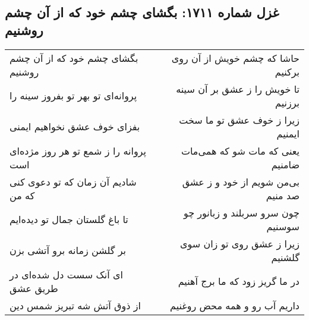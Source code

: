 \begin{center}
\section*{غزل شماره ۱۷۱۱: بگشای چشم خود که از آن چشم روشنیم}
\label{sec:1711}
\begin{longtable}{l p{0.5cm} r}
بگشای چشم خود که از آن چشم روشنیم
&&
حاشا که چشم خویش از آن روی برکنیم
\\
پروانه‌ای تو بهر تو بفروز سینه را
&&
تا خویش را ز عشق بر آن سینه برزنیم
\\
بفزای خوف عشق نخواهیم ایمنی
&&
زیرا ز خوف عشق تو ما سخت ایمنیم
\\
پروانه را ز شمع تو هر روز مژده‌ای است
&&
یعنی که مات شو که همی‌مات ضامنیم
\\
شادیم آن زمان که تو دعوی کنی که من
&&
بی‌من شویم از خود و ز عشق صد منیم
\\
تا باغ گلستان جمال تو دیده‌ایم
&&
چون سرو سربلند و زبانور چو سوسنیم
\\
بر گلشن زمانه برو آتشی بزن
&&
زیرا ز عشق روی تو زان سوی گلشنیم
\\
ای آنک سست دل شده‌ای در طریق عشق
&&
در ما گریز زود که ما برج آهنیم
\\
از ذوق آتش شه تبریز شمس دین
&&
داریم آب رو و همه محض روغنیم
\\
\end{longtable}
\end{center}
